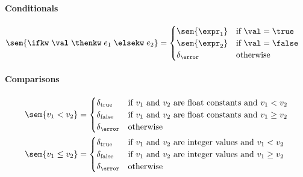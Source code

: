 \paragraph{Conditionals}
\begin{align*}
\sem{ \ifkw \; \val \; \thenkw \; e_1 \; \elsekw \; e_2 } & = 
\begin{cases}
	\sem{\expr_1}  & \text{if $\val = \true$} \\
	\sem{\expr_2}  & \text{if $\val = \false$} \\
	\delta_\error & \text{otherwise}
\end{cases}
\end{align*}
%

\paragraph{Comparisons}
\begin{align*}
\sem{ v_1 < v_2 } &= \begin{cases}
    \delta_{\text{true}} & \text{if $v_1$ and $v_2$ are float constants and~} v_1 < v_2 \\
    \delta_{\text{false}} & \text{if $v_1$ and $v_2$ are float constants and~} v_1 \geq v_2\\
    \delta_\error & \text{otherwise}
\end{cases} \\
\sem{ v_1 \leq v_2 } &=\begin{cases}
	\delta_{\text{true}} & \text{if $v_1$ and $v_2$ are integer values and~} v_1 < v_2 \\
	\delta_{\text{false}} & \text{if $v_1$ and $v_2$ are integer values and~} v_1 \geq v_2\\
	\delta_\error & \text{otherwise}
\end{cases}
\end{align*}
%

